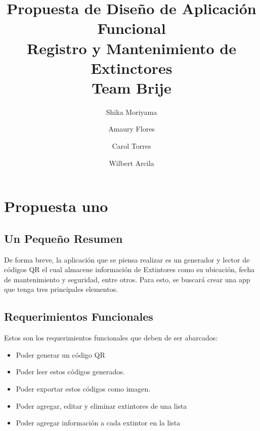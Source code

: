 \documentclass[a4paper,twoside,10pt]{report}
\begin{document}
\pagestyle{empty} %



\title{%
  Propuesta de Diseño de Aplicación Funcional\\
  \large Registro y Mantenimiento de Extinctores \\
    Team Brije}

\author{
  Shika Moriyama
  \and
  Amaury Flores
	\and
  Carol Torres
	\and
  Wilbert Arcila
}
\maketitle



\tableofcontents %
\cleardoublepage %

\chapter{Propuesta uno}

\section{Un Pequeño Resumen}

\par De forma breve, la aplicación que se piensa realizar es un generador y lector de códigos QR el cual almacene información de Extintores como su ubicación, fecha de mantenimiento y seguridad, entre otros. Para esto, se buscará crear una app que tenga tres principales elementos.

\section{Requerimientos Funcionales}

\par Estos son los requerimientos funcionales que deben de ser abarcados:
\begin{itemize}
	\item Poder generar un código QR
	\item Poder leer estos códigos generados.
	\item Poder exportar estos códigos como imagen. 
	\item Poder agregar, editar y eliminar extintores de una lista
	\item Poder agregar información a cada extintor en la lista
\end{itemize}
\end{document}
